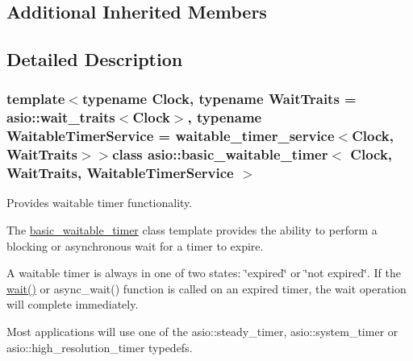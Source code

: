 \subsection*{Additional Inherited Members}


\subsection{Detailed Description}
\subsubsection*{template$<$typename Clock, typename Wait\+Traits = asio\+::wait\+\_\+traits$<$\+Clock$>$, typename Waitable\+Timer\+Service = waitable\+\_\+timer\+\_\+service$<$\+Clock, Wait\+Traits$>$$>$class asio\+::basic\+\_\+waitable\+\_\+timer$<$ Clock, Wait\+Traits, Waitable\+Timer\+Service $>$}

Provides waitable timer functionality. 

The \hyperlink{classasio_1_1basic__waitable__timer}{basic\+\_\+waitable\+\_\+timer} class template provides the ability to perform a blocking or asynchronous wait for a timer to expire.

A waitable timer is always in one of two states\+: \char`\"{}expired\char`\"{} or \char`\"{}not expired\char`\"{}. If the \hyperlink{classasio_1_1basic__waitable__timer_a2938c36fcd50c544ca290372785cf66e}{wait()} or async\+\_\+wait() function is called on an expired timer, the wait operation will complete immediately.

Most applications will use one of the asio\+::steady\+\_\+timer, asio\+::system\+\_\+timer or asio\+::high\+\_\+resolution\+\_\+timer typedefs.

